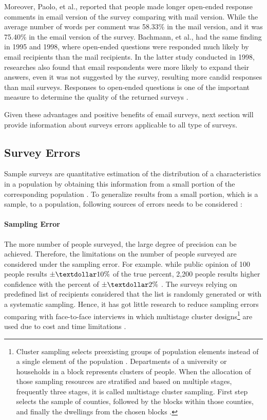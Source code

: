 Moreover, Paolo, et al., \cite{Paolo2009} reported that people made longer open-ended response comments in email version of the survey comparing with mail version. While the average number of words per comment was 58.33\% in the mail version, and it was 75.40\% in the email version of the survey. Bachmann, et al., \cite{BachmannD.ElfrinkJ.&Vazzana1999} had the same finding in 1995 and 1998, where open-ended questions were responded much likely by email recipients than the mail recipients. In the latter study conducted in 1998, researches also found that email respondents were more likely to expand their answers, even it was not suggested by the survey, resulting more candid responses than mail surveys. Responses to open-ended questions is one of the important measure to determine the quality of the returned surveys \cite{BachmannD.ElfrinkJ.&Vazzana1999}.
\vspace{1cm}

Given these advantages and positive benefits of email surveys, next section will provide information about surveys errors applicable to all type of surveys.

\subsection{Survey Errors}
\label{sec:2.1.2:SurErr}
Sample surveys are quantitative estimation of the distribution of a characteristics in a population by obtaining this information from a small portion of the corresponding population \cite{Dillman1991}. To generalize results from a small portion, which is a sample, to a population, following sources of errors needs to be considered \cite[page 9]{Dillman2006} \cite{Dillman1991}:

\paragraph{Sampling Error}
The more number of people surveyed, the large degree of precision can be achieved. Therefore, the limitations on the number of people surveyed are considered under the sampling error. For example. while public opinion of 100 people results \(\pm\textdollar10\%\) of the true percent, 2,200 people results higher confidence with the percent of \(\pm\textdollar2\%\) \cite[page 9]{Dillman2006}. The surveys relying on predefined list of recipients considered that the list is randomly generated or with a systematic sampling. Hence, it has got little research to reduce sampling errors comparing with face-to-face interviews in which multistage cluster designs\footnote{Cluster sampling selects preexisting groups of population elements instead of a single element of the population \cite[page 106]{Groves2009}. Departments of a university or households in a block represents clusters of people. When the allocation of those sampling resources are stratified and based on multiple stages, frequently three stages, it is called multistage cluster sampling. First step selects the sample of counties, followed by the blocks within those counties, and finally the dwellings from the chosen blocks \cite{Scott1969}.} are used due to cost and time limitations \cite[page 106]{Groves2009} \cite{Dillman1991}.


